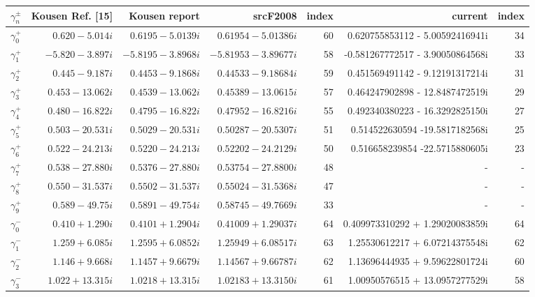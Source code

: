 \begin{table}
 \centering
 \begin{adjustbox}{width=1\textwidth}
     \small
 \begin{tabular}{c | r | r | r | r | r | r}
 \hline
 $\gamma^{\pm}_n$ & Kousen Ref. [15] & Kousen report & srcF2008 & index  & current & index\\
 \hline
 $\gamma_0^{+}$ & $ 0.620 - 5.014  i $ & $ 0.6195 - 5.0139 i$ & $ 0.61954  - 5.01386 i$ & 60  & 0.620755853112 - 5.00592416941i& 34 \\
 $\gamma_1^{+}$ & $-5.820 - 3.897  i $ & $-5.8195 - 3.8968 i$ & $-5.81953  - 3.89677 i$ & 58  &-0.581267772517 - 3.90050864568i& 33 \\
 $\gamma_2^{+}$ & $ 0.445 - 9.187  i $ & $ 0.4453 - 9.1868 i$ & $ 0.44533  - 9.18684 i$ & 59  &0.451569491142 -  9.12191317214i & 31 \\
 $\gamma_3^{+}$ & $ 0.453 - 13.062 i $ & $ 0.4539 - 13.062 i$ & $ 0.45389  - 13.0615 i$ & 57  &0.464247902898 - 12.8487472519i & 29 \\ 
 $\gamma_4^{+}$ & $ 0.480 - 16.822 i $ & $ 0.4795 - 16.822 i$ & $ 0.47952  - 16.8216 i$ & 55  &0.492340380223 - 16.3292825150i & 27 \\
 $\gamma_5^{+}$ & $ 0.503 - 20.531 i $ & $ 0.5029 - 20.531 i$ & $ 0.50287  - 20.5307 i$ & 51  &0.514522630594 -19.5817182568i& 25 \\
 $\gamma_6^{+}$ & $ 0.522 - 24.213 i $ & $ 0.5220 - 24.213 i$ & $ 0.52202  - 24.2129 i$ & 50  &0.516658239854 -22.5715880605i& 23 \\
 $\gamma_7^{+}$ & $ 0.538 - 27.880 i $ & $ 0.5376 - 27.880 i$ & $ 0.53754  - 27.8800 i$ & 48  & - & - \\
 $\gamma_8^{+}$ & $ 0.550 - 31.537 i $ & $ 0.5502 - 31.537 i$ & $ 0.55024  - 31.5368 i$ & 47  & - & - \\
 $\gamma_9^{+}$ & $ 0.589 - 49.75  i $ & $ 0.5891 - 49.754 i$ & $ 0.58745  - 49.7669 i$ & 33  &- &- \\ \hline
 $\gamma_0^{-}$ & $ 0.410 + 1.290  i $ & $ 0.4101 + 1.2904 i$ & $ 0.41009  + 1.29037 i$ & 64  &0.409973310292  + 1.29020083859i& 64 \\
 $\gamma_1^{-}$ & $ 1.259 + 6.085  i $ & $ 1.2595 + 6.0852 i$ & $ 1.25949  + 6.08517 i$ & 63  &1.25530612217  + 6.07214375548i & 62 \\
 $\gamma_2^{-}$ & $ 1.146 + 9.668  i $ & $ 1.1457 + 9.6679 i$ & $ 1.14567  + 9.66787 i$ & 62  &1.13696444935  + 9.59622801724i &  60\\
$\gamma_3^{-}$ & $ 1.022 + 13.315 i $ & $ 1.0218 + 13.315 i$ & $ 1.02183  + 13.3150 i$ & 61  &1.00950576515 + 13.0957277529i & 58  \\

\end{tabular}
\end{adjustbox}
\end{table}
